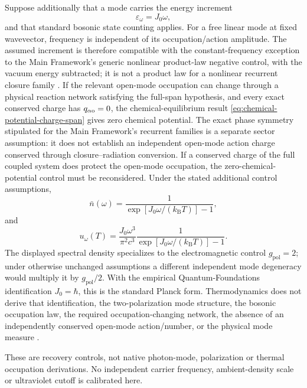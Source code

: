 \documentclass[11pt]{article}
\theoremstyle{definition}
\newcommand{\kb}{k_{\mathrm B}}
\begin{document}
Suppose additionally that a mode carries the energy increment
\begin{equation}
  \varepsilon_\omega=J_0\omega,
  \label{eq:mode-energy-control}
\end{equation}
and that standard bosonic state counting applies. For a free linear mode at
fixed wavevector, frequency is independent of its occupation/action amplitude.
The assumed increment is therefore compatible with the constant-frequency
exception to the Main Framework's generic nonlinear product-law negative
control, with the vacuum energy subtracted; it is not a product law for a
nonlinear recurrent closure family \cite{CmotionMainFramework2026}.  If the relevant open-mode occupation can
change through a physical reaction network satisfying the full-span hypothesis,
and every exact conserved charge has $q_{\alpha{\rm o}}=0$, the chemical-equilibrium result
\cref{eq:chemical-potential-charge-span} gives zero chemical potential.  The exact phase symmetry stipulated for the Main Framework's recurrent
families is a separate sector assumption: it does not establish an independent
open-mode action charge conserved through closure--radiation conversion.
If a conserved charge of the full coupled system does protect the open-mode
occupation, the zero-chemical-potential control must be reconsidered.
Under the stated additional control assumptions,
\begin{equation}
  \bar n(\omega)
  =\frac{1}{\exp[J_0\omega/(\kb T)]-1},
  \label{eq:planck-occ-control}
\end{equation}
and
\begin{equation}
  u_\omega(T)
  =\frac{J_0\omega^3}{\pi^2c^3}
  \frac{1}{\exp[J_0\omega/(\kb T)]-1}.
  \label{eq:planck-control}
\end{equation}
The displayed spectral density specializes to the electromagnetic control
$g_{\mathrm{pol}}=2$; under otherwise unchanged assumptions a different independent
mode degeneracy would multiply it by $g_{\mathrm{pol}}/2$.
With the empirical Quantum-Foundations identification $J_0=\hbar$, this is the standard
Planck form.  Thermodynamics does not derive that identification, the two-polarization
mode structure, the bosonic occupation law, the required occupation-changing network,
the absence of an independently conserved open-mode action/number, or the physical
mode measure \cite{CmotionQuantumFoundations2026}.

These are recovery controls, not native photon-mode, polarization or thermal
occupation derivations.  No independent carrier frequency, ambient-density
scale or ultraviolet cutoff is calibrated here.
\end{document}
